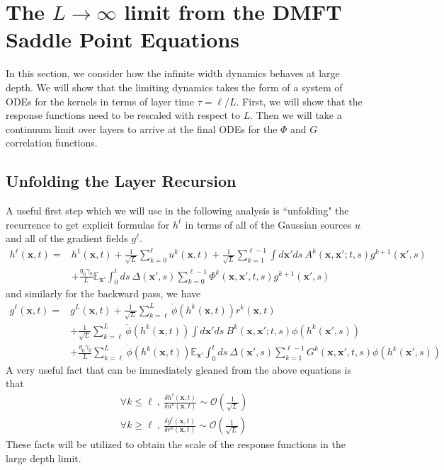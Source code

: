 \documentclass{article} %
\def\x{\bm x}
\begin{document}
\section{The $L \to \infty$ limit from the DMFT Saddle Point Equations}\label{app:large_L_dmft}

In this section, we consider how the infinite width dynamics behaves at large depth. We will show that the limiting dynamics takes the form of a system of ODEs for the kernels in terms of layer time $\tau = \ell/ L$. First, we will show that the response functions need to be rescaled with respect to $L$. Then we will take a continuum limit over layers to arrive at the final ODEs for the $\Phi$ and $G$ correlation functions. 


\subsection{Unfolding the Layer Recursion}
A useful first step which we will use in the following analysis is ``unfolding" the recurrence to get explicit formulas for $h^\ell$ in terms of all of the Gaussian sources $u$ and all of the gradient fields $g^\ell$.     
\begin{align}
    h^\ell(\x,t) =& h^1(\x,t) + \frac{1}{\sqrt L} \sum_{k=0}^{\ell} u^{k}(\x,t) + \frac{1}{\sqrt L} \sum_{k=1}^{\ell-1} \int d\x' ds \ A^{k}(\x,\x';t,s) g^{k+1}(\x',s) \nonumber
    \\
    &+\frac{\eta_0 \gamma_0}{L}  \mathbb{E}_{\x'} \int_0^t ds \  \Delta(\x',s) \sum_{k=0}^{\ell-1} \Phi^k(\x,\x',t,s) g^{k+1}(\x',s) 
\end{align}
and similarly for the backward pass, we have
\begin{align}
    g^\ell(\x,t) =& g^L(\x,t) + \frac{1}{\sqrt L} \sum_{k=\ell}^{L} \dot\phi(h^k(\x,t)) r^{k}(\x,t) \nonumber
    \\
    &+ \frac{1}{\sqrt L} \sum_{k=\ell}^{L} \dot\phi(h^k(\x,t)) \int d\x' ds \ B^{k}(\x,\x';t,s)  \phi(h^k(\x',s)) \nonumber
    \\
    &+\frac{\eta_0 \gamma_0}{L}   \sum_{k=\ell}^{L} \dot\phi(h^k(\x,t)) \mathbb{E}_{\x'} \int_0^t ds \  \Delta(\x',s) \sum_{k=1}^{\ell-1} G^k(\x,\x',t,s) \phi(h^k(\x',s))
\end{align}
A very useful fact that can be immediately gleaned from the above equations is that 
\begin{align}
    \forall k \leq \ell \ , \ \frac{\delta h^\ell(\x,t)}{\delta u^k(\x,t)} \sim \mathcal{O}\left(\frac{1}{\sqrt L}\right) \nonumber
    \\
    \forall k \geq \ell \ , \ \frac{\delta g^\ell(\x,t)}{\delta r^k(\x,t)} \sim \mathcal{O}\left(\frac{1}{\sqrt L}\right)
\end{align}
These facts will be utilized to obtain the scale of the response functions in the large depth limit. 
\end{document}
